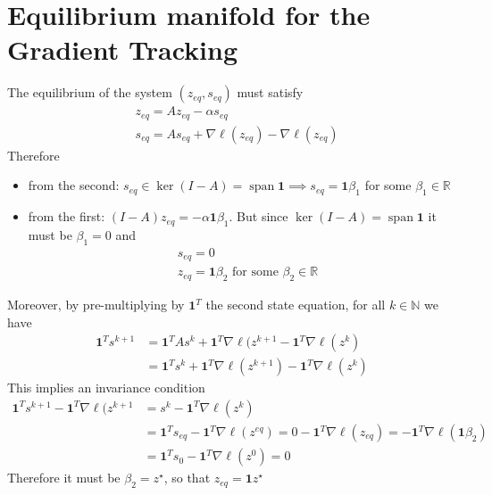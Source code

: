 \documentclass{book}
\DeclareMathOperator{\vspan}{span}
\newcommand{\R}{\mathbb{R}}
\newcommand{\N}{\mathbb{N}}
\theoremstyle{theoremv2}
\theoremstyle{defv2}
\theoremstyle{remark}
\theoremstyle{remark}
\theoremstyle{definition}
\theoremstyle{definition}
\begin{document}
\section{Equilibrium manifold for the Gradient Tracking}
The equilibrium of the system $(z_{eq},s_{eq})$ must satisfy
\begin{align*}
    & z_{eq} = A z_{eq}-\alpha s_{eq} \\
    & s_{eq} = A s_{eq} + \nabla\boldsymbol{\ell}(z_{eq}) - \nabla\boldsymbol{\ell}(z_{eq})
\end{align*}
Therefore 
\begin{itemize}
    \item from the second: $s_{eq}\in\ker(I-A)=\vspan \boldsymbol{1} \implies s_{eq} =\boldsymbol{1}\beta_1$ for some $\beta_1\in\R$
    \item from the first: $(I-A)z_{eq} = -\alpha\boldsymbol{1}\beta_1$. But since $\ker(I-A)=\vspan \boldsymbol{1}$ it must be $\beta_1=0$ and  
        \begin{align*}
            &s_{eq} = 0 \\
            &z_{eq} = \boldsymbol{1} \beta_2 \text{ for some } \beta_2 \in\R
        \end{align*}
\end{itemize}
Moreover, by pre-multiplying by $\boldsymbol{1}^T$ the second state equation, for all $k\in\N$ we have
\begin{align*}
    \boldsymbol{1}^T s^{k+1} &= \boldsymbol{1}^T A s^{k} +\boldsymbol{1}^T \nabla\boldsymbol{\ell}(z^{k+1} -\boldsymbol{1}^T \nabla\boldsymbol{\ell}(z^{k})\\ 
    &= \boldsymbol{1}^T s^k+\boldsymbol{1}^T \nabla\boldsymbol{\ell}(z^{k+1}) -\boldsymbol{1}^T \nabla\boldsymbol{\ell}(z^{k}) 
\end{align*}
This implies an invariance condition 
\begin{align*}
    \boldsymbol{1}^T s^{k+1} -\boldsymbol{1}^T \nabla\boldsymbol{\ell}(z^{k+1} &=  s^{k}  -\boldsymbol{1}^T \nabla\boldsymbol{\ell}(z^{k})\\ 
    &= \boldsymbol{1}^Ts_{eq}-\boldsymbol{1}^T \nabla\boldsymbol{\ell}(z^{eq}) = 0 - \boldsymbol{1}^T\nabla\boldsymbol{\ell}(z_{eq}) = -\boldsymbol{1}^T\nabla\boldsymbol{\ell}(\boldsymbol{1}\beta_2)\\ 
    &= \boldsymbol{1}^Ts_{0}-\boldsymbol{1}^T \nabla\boldsymbol{\ell}(z^{0}) = 0
\end{align*}
Therefore it must be $\beta_2=z^\star$, so that $z_{eq} =\boldsymbol{1}z^\star$
\end{document}
